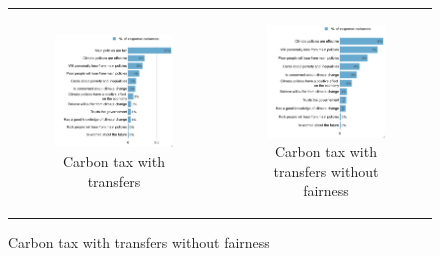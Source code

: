 \documentclass{article}
\begin{document}
\begin{figure}[h!]
\begin{center}
	\begin{tabular}{cc}
		\begin{subfigure}{0.5\textwidth}
		\caption{Carbon tax with transfers}
			\includegraphics[width=\textwidth]{lmg_tax_transfers_indices_non_standardized}
		\end{subfigure}&
		\begin{subfigure}{0.5\textwidth}
		\caption{Carbon tax with transfers without fairness}
			\includegraphics[width=\textwidth]{lmg_tax_transfers_indices_no_fairness_non_standardized}
		\end{subfigure}\\
	\end{tabular}
\end{center}
\end{figure}
\end{document}
